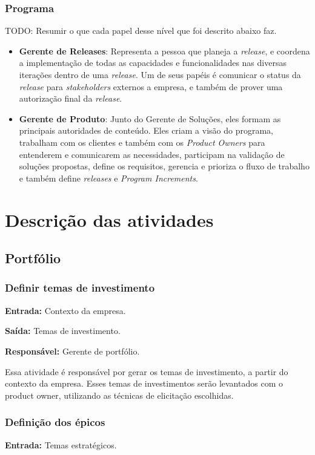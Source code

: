 \subsubsection{Programa}

  TODO: Resumir o que cada papel desse nível que foi descrito abaixo faz.

  \begin{itemize}
    \item \textbf {Gerente de Releases}: Representa a pessoa que planeja a \textit{release}, e coordena a implementação de todas as capacidades e funcionalidades nas diversas iterações dentro de uma \textit{release}. Um de seus papéis é comunicar o status da \textit{release} para \textit{stakeholders} externos a empresa, e também de prover uma autorização final da \textit{release}.
    \item \textbf {Gerente de Produto}: Junto do Gerente de Soluções, eles formam as principais autoridades de conteúdo. Eles criam a visão do programa, trabalham com os clientes e também com os \textit{Product Owners} para entenderem e comunicarem as necessidades, participam na validação de soluções propostas, define os requisitos, gerencia e prioriza o fluxo de trabalho e também define \textit{releases} e \textit{Program Increments}.
  \end{itemize}

\section{Descrição das atividades}

\subsection{Portfólio}
  \subsubsection{Definir temas de investimento}
    \textbf{Entrada:} Contexto da empresa.

    \textbf{Saída:} Temas de investimento.

    \textbf{Responsável:} Gerente de portfólio.

    Essa atividade é responsável por gerar os temas de investimento, a partir do contexto da empresa. Esses temas de investimentos serão levantados com o product owner, utilizando as técnicas de elicitação escolhidas.

  \subsubsection{Definição dos épicos}
    \textbf{Entrada:} Temas estratégicos.

